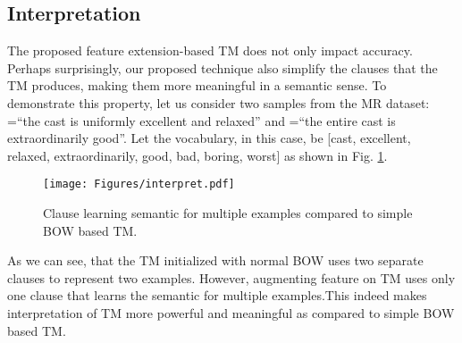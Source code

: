 \documentclass[11pt]{article}
\begin{document}
\begin{table}[h]
\centering
{}
\caption{Comparison of feature extended TM with the state of the art for TREC. Reported accuracy of TM is the mean of last 50 epochs of 5 independent experiments with their standard deviation.}\label{table44}
\end{table}

\subsection{Interpretation}
The proposed feature extension-based TM does not only impact accuracy. Perhaps surprisingly, our proposed technique also simplify the clauses that the TM produces, making them more meaningful in a semantic sense. To demonstrate this property, let us consider two samples from the MR dataset:  =``the cast is uniformly excellent and relaxed'' and =``the entire cast is extraordinarily good''. Let the vocabulary, in this case, be [cast, excellent, relaxed, extraordinarily, good, bad, boring, worst] as shown in Fig. \ref{fig6}.


\begin{figure}[h]
    \centering
    \texttt{[image: Figures/interpret.pdf]}
    \caption{Clause learning semantic for multiple examples compared to simple BOW based TM.}
    \label{fig6}
\end{figure}
As we can see, that the TM initialized with normal BOW uses two separate clauses to represent two examples. However, augmenting feature on TM uses only one clause that learns the semantic for multiple examples.This indeed makes interpretation of TM more powerful and meaningful as compared to simple BOW based TM.
\end{document}
